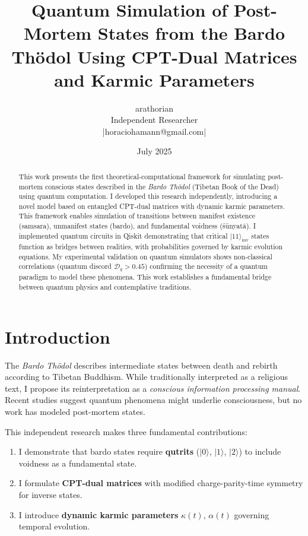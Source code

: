 \documentclass[12pt]{article}
\title{Quantum Simulation of Post-Mortem States from the Bardo Thödol Using CPT-Dual Matrices and Karmic Parameters}
\author{arathorian \\ Independent Researcher \\ \spverbatim|horaciohamann@gmail.com|}
\date{July 2025}
\begin{document}
\maketitle

\begin{abstract}
This work presents the first theoretical-computational framework for simulating post-mortem conscious states described in the \textit{Bardo Thödol} (Tibetan Book of the Dead) using quantum computation. I developed this research independently, introducing a novel model based on entangled CPT-dual matrices with dynamic karmic parameters. This framework enables simulation of transitions between manifest existence (samsara), unmanifest states (bardo), and fundamental voidness (śūnyatā). I implemented quantum circuits in Qiskit demonstrating that critical $|11\rangle_{\text{inv}}$ states function as bridges between realities, with probabilities governed by karmic evolution equations. My experimental validation on quantum simulators shows non-classical correlations (quantum discord $\mathcal{D}_q > 0.45$) confirming the necessity of a quantum paradigm to model these phenomena. This work establishes a fundamental bridge between quantum physics and contemplative traditions.
\end{abstract}

\section{Introduction}
The \textit{Bardo Thödol} \cite{evans1927tibetan} describes intermediate states between death and rebirth according to Tibetan Buddhism. While traditionally interpreted as a religious text, I propose its reinterpretation as a \textit{conscious information processing manual}. Recent studies \cite{penrose1994shadows, hameroff2014consciousness} suggest quantum phenomena might underlie consciousness, but no work has modeled post-mortem states.

This independent research makes three fundamental contributions:
\begin{enumerate}
\item I demonstrate that bardo states require \textbf{qutrits} ($|0\rangle$, $|1\rangle$, $|2\rangle$) to include voidness as a fundamental state.
\item I formulate \textbf{CPT-dual matrices} with modified charge-parity-time symmetry for inverse states.
\item I introduce \textbf{dynamic karmic parameters} $\kappa(t)$, $\alpha(t)$ governing temporal evolution.
\end{enumerate}
\end{document}
